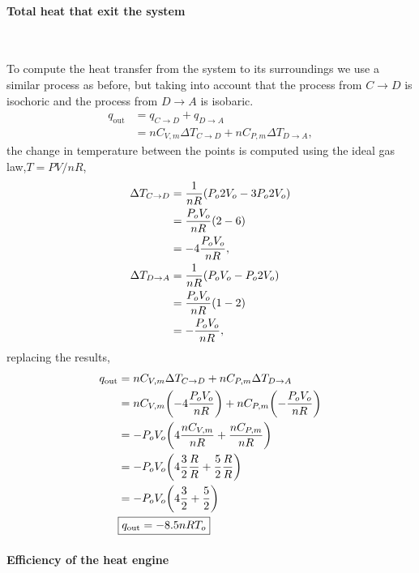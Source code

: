 \documentclass[main.tex]{subfiles}
\begin{document}
\paragraph{Total heat that exit the system}~

To compute the heat transfer from the system to its surroundings we use a similar process as before, but taking into account that the process from $C\to D$ is isochoric and the process from $D\to A$ is isobaric.
\begin{align*}
    q_{\mathrm{out}} &= q_{C\to D} + q_{D\to A} \\
    &= nC_{V,m}\Delta T_{C\to D} + nC_{P,m}\Delta T_{D\to A},
\end{align*}
the change in temperature between the points is computed using the ideal gas law,$T=PV/nR$,
\begin{align*}
    \Delta T_{C\to D} &= \frac{1}{nR}\qty(P_o2V_o-3P_o2V_o) \\
    &= \frac{P_oV_o}{nR}\qty(2-6) \\
    &= -4\frac{P_oV_o}{nR}, \\
    \Delta T_{D\to A} &= \frac{1}{nR}\qty(P_oV_o-P_o2V_o) \\
    &= \frac{P_oV_o}{nR}\qty(1-2) \\
    &= -\frac{P_oV_o}{nR},
\end{align*}
replacing the results,
\begin{align*}
    q_{\mathrm{out}} &= nC_{V,m}\Delta T_{C\to D} + nC_{P,m}\Delta T_{D\to A} \\
    &= nC_{V,m}\qty(-4\frac{P_oV_o}{nR}) + nC_{P,m}\qty(-\frac{P_oV_o}{nR}) \\
    &= -P_oV_o\qty(4\frac{nC_{V,m}}{nR} + \frac{nC_{P,m}}{nR}) \\
    &= -P_oV_o\qty(4\frac{3}{2}\frac{R}{R} + \frac{5}{2}\frac{R}{R}) \\
    &= -P_oV_o\qty(4\frac{3}{2} + \frac{5}{2}) \\
    &\begin{gathered}
        \boxed{q_{\mathrm{out}} = -8.5nRT_o}
    \end{gathered}
\end{align*}

\paragraph{Efficiency of the heat engine}~
\end{document}
